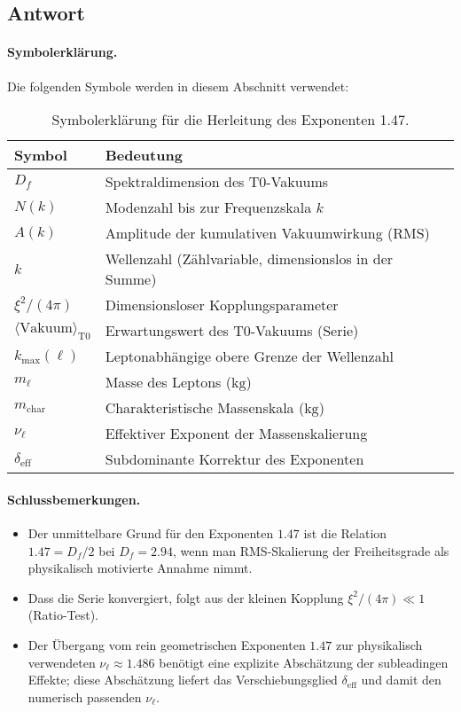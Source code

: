 \documentclass[12pt,a4paper]{article}
\theoremstyle{remark}
\newenvironment{answer}{\subsection*{Antwort}}{\vspace{1em}}
\begin{document}
\begin{answer}
	\paragraph{Symbolerklärung.}
	Die folgenden Symbole werden in diesem Abschnitt verwendet:
	\begin{table}[h]
		\centering
		\begin{tabular}{ll}
			\toprule
			\textbf{Symbol} & \textbf{Bedeutung} \\
			\midrule
			\( D_f \) & Spektraldimension des T0-Vakuums \\
			\( N(k) \) & Modenzahl bis zur Frequenzskala \( k \) \\
			\( A(k) \) & Amplitude der kumulativen Vakuumwirkung (RMS) \\
			\( k \) & Wellenzahl (Zählvariable, dimensionslos in der Summe) \\
			\( \xi^2 / (4\pi) \) & Dimensionsloser Kopplungsparameter \\
			\( \langle \mathrm{Vakuum} \rangle_{\text{T0}} \) & Erwartungswert des T0-Vakuums (Serie) \\
			\( k_{\max}(\ell) \) & Leptonabhängige obere Grenze der Wellenzahl \\
			\( m_\ell \) & Masse des Leptons (\(\text{kg}\)) \\
			\( m_{\text{char}} \) & Charakteristische Massenskala (\(\text{kg}\)) \\
			\( \nu_\ell \) & Effektiver Exponent der Massenskalierung \\
			\( \delta_{\text{eff}} \) & Subdominante Korrektur des Exponenten \\
			\bottomrule
		\end{tabular}
		\caption{Symbolerklärung für die Herleitung des Exponenten 1.47.}
	\end{table}
	
	\paragraph{Schlussbemerkungen.}
	\begin{itemize}
		\item Der unmittelbare Grund für den Exponenten \( 1.47 \) ist die Relation \( 1.47 = D_f / 2 \) bei \( D_f = 2.94 \), wenn man RMS-Skalierung der Freiheitsgrade als physikalisch motivierte Annahme nimmt.
		\item Dass die Serie konvergiert, folgt aus der kleinen Kopplung \( \xi^2 / (4\pi) \ll 1 \) (Ratio-Test).
		\item Der Übergang vom rein geometrischen Exponenten \( 1.47 \) zur physikalisch verwendeten \( \nu_\ell \approx 1.486 \) benötigt eine explizite Abschätzung der subleadingen Effekte; diese Abschätzung liefert das Verschiebungsglied \( \delta_{\text{eff}} \) und damit den numerisch passenden \( \nu_\ell \).
	\end{itemize}
	

\end{answer}
\end{document}
